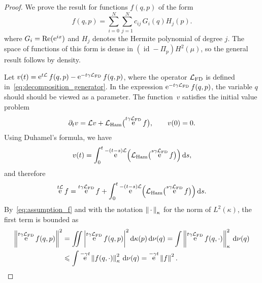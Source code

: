 \documentclass[11pt,a4paper]{article}
\DeclareMathOperator{\e}{e}
\DeclareMathOperator{\id}{id}
\newcommand{\dummy}{\,\cdot\,}
\renewcommand{\d}{\mathrm d}
\theoremstyle{plain}
\numberwithin{equation}{section}
\renewcommand{\leq}{\leqslant}
\begin{document}
\begin{proof}
    We prove the result for functions $f(q, p)$ of the form
    \begin{equation}
        \label{eq:expansion}
        f(q, p) = \sum_{i=0}^{N} \sum_{j=1}^{N} c_{ij} \, G_i(q) H_j(p).
    \end{equation}
    where $G_i = {\rm Re}(\e^{ix})$ and $H_j$ denotes the Hermite polynomial of degree $j$.
    The space of functions of this form is dense in $(\id - \Pi_p) H^2(\mu)$,
    so the general result follows by density.

    Let $v(t) = \e^{t \mathcal L} f(q, p) - \e^{- t \gamma \mathcal L_{\rm FD}} f(q, p)$,
    where the operator $\mathcal L_{\rm FD}$ is defined in~\eqref{eq:decomposition_generator}.
    In the expression $\e^{- t \gamma \mathcal L_{\rm FD}} f(q, p)$,
    the variable $q$ should should be viewed as a parameter.
    The function~$v$ satisfies the initial value problem
    \[
        \partial_t v = \mathcal L v +  \mathcal L_{\rm Ham} \bigl(\e^{t \gamma \mathcal L_{\rm FD}} f\bigr), \qquad v(0) = 0.
    \]
    Using Duhamel's formula, we have
    \[
        v(t) = \int_{0}^{t} \e^{- (t-s) \mathcal L}  \Bigl( \mathcal L_{\rm Ham} \bigl(\e^{s \gamma \mathcal L_{\rm FD}} f\bigr) \Bigr) \, \d s,
    \]
    and therefore
    \begin{equation}
        \label{eq:intermediate_decay_correlation}
        \e^{t \mathcal L} f =  \e^{t \gamma \mathcal L_{\rm FD}} f
        + \int_{0}^{t} \e^{- (t-s) \mathcal L}  \Bigl( \mathcal L_{\rm Ham} \bigl(\e^{s \gamma \mathcal L_{\rm FD}} f\bigr) \Bigr) \, \d s.
    \end{equation}
    By~\eqref{eq:assumption_f} and with the notation $\norm{\dummy}[\kappa]$ for the norm of $L^2(\kappa)$,
    the first term is bounded as
    \begin{align}
        \notag
        \norm{\e^{t \gamma \mathcal L_{\rm FD}} f(q, p)}^2
        &= \int \!\!\!\! \int  \abs{\e^{t \gamma \mathcal L_{\rm FD}} f(q, p) }^2 \d \kappa(p) \,\d \nu(q)
        = \int \norm{\e^{t \gamma \mathcal L_{\rm FD}} f(q, \cdot) }[\kappa]^2 \, \d \nu(q) \\
        \label{eq:bound_first_term}
        &\leq \int \e^{-\gamma t} \norm{f(q, \cdot) }[\kappa]^2 \, \d \nu(q) = \e^{-\gamma t} \norm{f}^2.

\end{align}
\end{proof}
\end{document}
